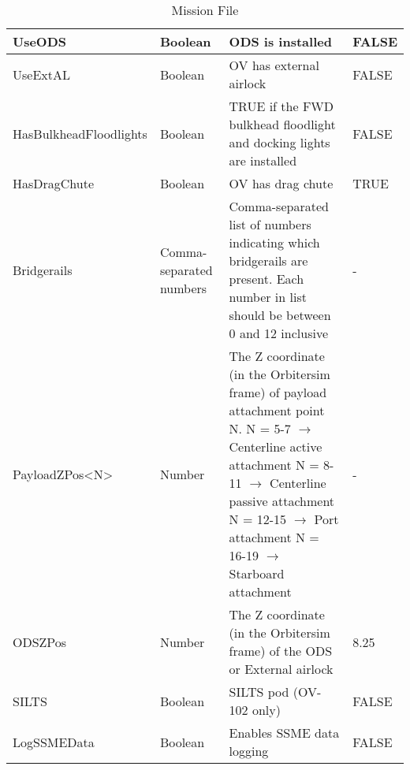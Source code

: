 \documentclass[Space_Shuttle_Ultra_Manual.tex]{subfiles}
\begin{document}
\begin{table}[H]
\begin{tabular}{|l|p{1.5cm}|p{8cm}|l|}
	\hline
	\rule{0pt}{2ex}
	UseODS & Boolean & ODS is installed & FALSE\\
	\hline
	\rule{0pt}{2ex}
	UseExtAL & Boolean & OV has external airlock & FALSE\\
	\hline
	\rule{0pt}{2ex}
	HasBulkheadFloodlights & Boolean & TRUE if the FWD bulkhead floodlight and docking lights are installed & FALSE\\
	\hline
	\rule{0pt}{2ex}
	HasDragChute & Boolean & OV has drag chute & TRUE\\
	\hline
	\rule{0pt}{2ex}
	Bridgerails & Comma-separated numbers & Comma-separated list of numbers indicating which bridgerails are present. Each number in list should be between 0 and 12 inclusive & -\\
	\hline
	\rule{0pt}{2ex}
	PayloadZPos<N> & Number & The Z coordinate (in the Orbitersim frame) of payload attachment point N.\newline
N = 5-7 $\rightarrow$ Centerline active attachment\newline
N = 8-11 $\rightarrow$ Centerline passive attachment\newline
N = 12-15 $\rightarrow$ Port attachment\newline
N = 16-19 $\rightarrow$ Starboard attachment & - \\
	\hline
	\rule{0pt}{2ex}
	ODSZPos & Number & The Z coordinate (in the Orbitersim frame) of the ODS or External airlock & 8.25\\
	\hline
	\rule{0pt}{2ex}
	SILTS & Boolean & SILTS pod (OV-102 only) & FALSE\\
	\hline\rule{0pt}{2ex}
	LogSSMEData & Boolean & Enables SSME data logging & FALSE\\
	\hline
  \end{tabular}
  \caption{Mission File}
  \label{tab:Mission_File}
\end{table}
\end{document}

